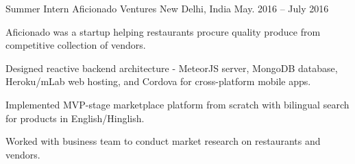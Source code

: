 \begin{cvexperience}
\cvposition
	{Summer Intern} %
	{Aficionado Ventures} %
	{} %
	{New Delhi, India} %
	{May. 2016 -- July 2016} %
	{\begin{cvitems} %
		\item {Aficionado was a startup helping restaurants procure quality produce from competitive collection of vendors.}
		\item {Designed reactive backend architecture - MeteorJS server, MongoDB database, Heroku/mLab web hosting, and Cordova for cross-platform mobile apps.}
		\item {Implemented MVP-stage marketplace platform from scratch with bilingual search for products in English/Hinglish.}
		\item {Worked with business team to conduct market research on restaurants and vendors.}
	\end{cvitems}}

\end{cvexperience}
